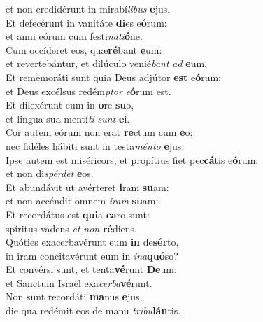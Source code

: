 \evenverse et non credidérunt in mirabí\textit{li}\textit{bus} \textbf{e}jus.\\
\oddverse Et defecérunt in vanitáte \textbf{di}es e\textbf{ó}rum:~\*\\
\oddverse et anni eórum cum festi\textit{na}\textit{ti}\textbf{ó}ne.\\
\evenverse Cum occíderet eos, quæ\textbf{ré}bant \textbf{e}um:~\*\\
\evenverse et revertebántur, et dilúculo venié\textit{bant} \textit{ad} \textbf{e}um.\\
\oddverse Et rememoráti sunt quia Deus adjútor \textbf{est} e\textbf{ó}rum:~\*\\
\oddverse et Deus excélsus redém\textit{ptor} \textit{e}\textbf{ó}rum est.\\
\evenverse Et dilexérunt eum in \textbf{o}re \textbf{su}o,~\*\\
\evenverse et lingua sua mentí\textit{ti} \textit{sunt} \textbf{e}i.\\
\oddverse Cor autem eórum non erat \textbf{re}ctum cum \textbf{e}o:~\*\\
\oddverse nec fidéles hábiti sunt in testa\textit{mén}\textit{to} \textbf{e}jus.\\
\evenverse Ipse autem est miséricors, et propítius fiet pec\textbf{cá}tis e\textbf{ó}rum:~\*\\
\evenverse et non di\textit{spér}\textit{det} \textbf{e}os.\\
\oddverse Et abundávit ut avérteret \textbf{i}ram \textbf{su}am:~\*\\
\oddverse et non accéndit omnem \textit{i}\textit{ram} \textbf{su}am:\\
\evenverse Et recordátus est \textbf{qui}a \textbf{ca}ro sunt:~\*\\
\evenverse spíritus vadens \textit{et} \textit{non} \textbf{ré}diens.\\
\oddverse Quóties exacerbavérunt eum \textbf{in} de\textbf{sér}to,~\*\\
\oddverse in iram concitavérunt eum in \textit{i}\textit{na}\textbf{quó}so?\\
\evenverse Et convérsi sunt, et tenta\textbf{vé}runt \textbf{De}um:~\*\\
\evenverse et Sanctum Israël exa\textit{cer}\textit{ba}\textbf{vé}runt.\\
\oddverse Non sunt recordáti \textbf{ma}nus \textbf{e}jus,~\*\\
\oddverse die qua redémit eos de manu \textit{tri}\textit{bu}\textbf{lán}tis.\\

